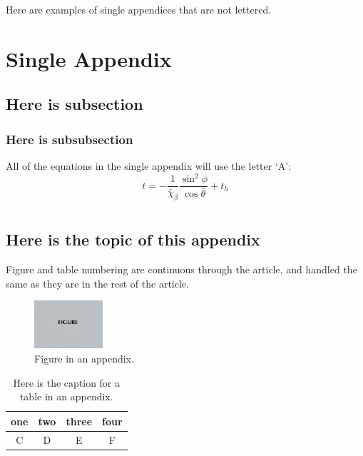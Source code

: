 \documentclass[preprint]{JASA}
\begin{document}
Here are examples of single appendices that are not lettered.


\appendix*


\section{Single Appendix}
\subsection{Here is subsection}
\subsubsection{Here is subsubsection}

All of the equations in the single appendix will use the letter `A':
\begin{equation}
t=-\frac{1}{\bar{\chi}_\beta}\frac{\sin^2\phi}{\cos\bar\theta}+t_h
\end{equation}



\appendix*

\section{}
\subsection{Here is the topic of this appendix}


\newpage
{}
Figure and table numbering are continuous through the article,
and handled the same as they are in the rest of the article.

\begin{figure}[ht]
\includegraphics[width=1in]{figsamp}
\caption{Figure in an appendix.}
\end{figure}


\begin{table}[ht]
\caption{Here is the caption for a table in an appendix.}
\centering
\begin{ruledtabular}
\begin{tabular}{cccc}
one&two&three&four\\
\hline
C&D&E&F\\
\end{tabular}
\end{ruledtabular}
\vskip12pt
\end{table}
\end{document}
